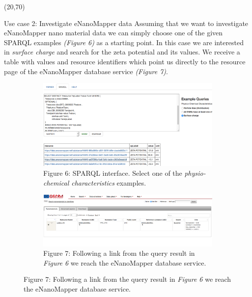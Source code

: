 \documentclass[final]{beamer}
\begin{document}
\begin{frame}{}
        
    \begin{textblock}{62}(20,70)
      \justifying
      \begin{block}{Use case 2: Investigate eNanoMapper data}
        Assuming that we want to investigate eNanoMapper nano material data we can simply choose one of the given SPARQL examples \emph{(Figure 6)} as a starting point. In this case we are interested in \emph{surface charge} and search for the zeta potential and its values. We receive a table with values and resource identifiers which point us directly to the resource page of the eNanoMapper database service \emph{(Figure 7)}.
        \begin{figure}
          \vspace{0.05\textwidth}
          \hspace{-0.1\textwidth}
          \begin{subfigure}[c]{0.3\textwidth}
            \includegraphics[width=\textwidth,keepaspectratio]{onto-use-case-2a.png}
            \caption{Figure 6: SPARQL interface. Select one of the \emph{physio-chemical characteristics} examples.}
          \end{subfigure}
          \hspace{0.2\textwidth}
          \begin{subfigure}[c]{0.4\textwidth}
            \includegraphics[width=\textwidth,keepaspectratio]{onto-use-case-2b.png}
            \caption{Figure 7: Following a link from the query result in \emph{Figure 6} we reach the eNanoMapper database service.}
          \end{subfigure}
        \end{figure}
      \end{block}
    \end{textblock}
    

\end{frame}
\end{document}
